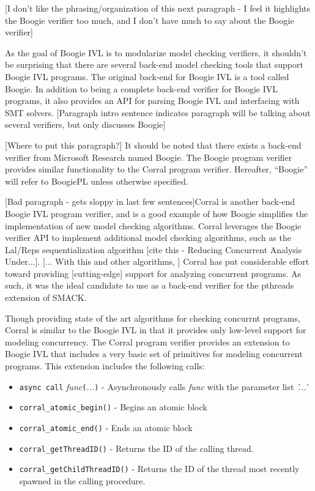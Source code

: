 [I don't like the phrasing/organization of this next paragraph - I
feel it highlights the Boogie verifier too much, and I don't have much
to say about the Boogie verifier] 

As the goal of Boogie IVL is to modularize model checking verifiers,
it shouldn't be surprising that there are several back-end model
checking tools that support Boogie IVL programs.  The original
back-end for Boogie IVL is a tool called Boogie.  In addition to being
a complete back-end verifier for Boogie IVL programs, it also provides
an API for parsing Boogie IVL and interfacing with SMT solvers.
[Paragraph intro sentence indicates paragraph will be talking about
several verifiers, but only discusses Boogie] 

[Where to put this paragraph?] It should be noted that there exists a
back-end verifier from Microsoft Research named Boogie.  The Boogie
program verifier provides similar functionality to the Corral program
verifier.  Hereafter, ``Boogie'' will refer to BoogiePL unless
otherwise specified. 

[Bad paragraph - gets sloppy in last few sentences]Corral is another
back-end Boogie IVL program verifier, and is a good example of how
Boogie simplifies the implementation of new model checking algorithms.
Corral leverages the Boogie verifier API to implement additional model
checking algorithms, such as the Lal/Reps sequentialization algorithm
[cite this - Reducing Concurrent Analysis Under...].  [... With this
and other algorithms, ] Corral has put considerable effort toward
providing [cutting-edge] support for analyzing concurrent programs.
As such, it was the ideal candidate to use as a back-end verifier for
the pthreads extension of SMACK. 

Though providing state of the art algorithms for checking concurrnt
programs, Corral is similar to the Boogie IVL in that it provides only
low-level support for modeling concurrency.  The Corral program
verifier provides an extension to Boogie IVL that includes a very
basic set of primitives for modeling concurrent programs.  This
extension includes the following calls: 

\begin{itemize}
\item \lstinline|async call| \emph{func}\lstinline|(|\emph{...}\lstinline|)| - Asynchronously calls \emph{func} with the parameter list \emph{'...'}
\item \lstinline|corral_atomic_begin()| - Begins an atomic block
\item \lstinline|corral_atomic_end()| - Ends an atomic block
\item \lstinline|corral_getThreadID()| - Returns the ID of the calling thread.
\item \lstinline|corral_getChildThreadID()| - Returns the ID of the thread most recently spawned in the calling procedure.
\end{itemize}

